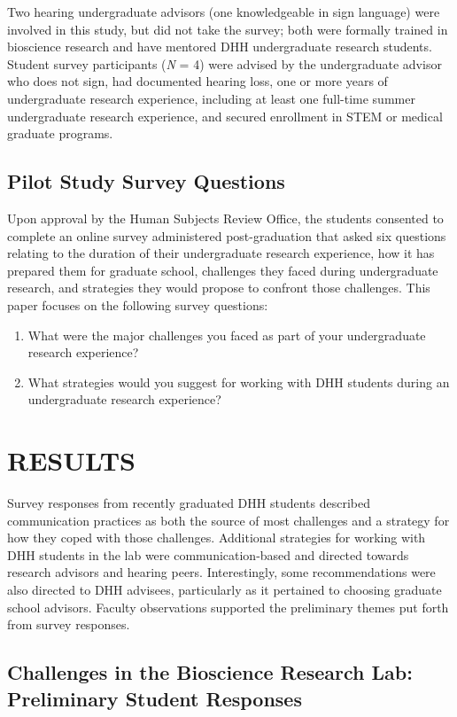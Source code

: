 \documentclass[11.5pt]{sig-alternate} %
\begin{document}
\begin{large}
Two hearing undergraduate advisors (one knowledgeable in sign language) were involved in this study, but did not take the survey; both were formally trained in bioscience research and have mentored DHH undergraduate research students. Student survey participants (\textit{N} = 4) were advised by the undergraduate advisor who does not sign, had documented hearing loss, one or more years of undergraduate research experience, including at least one full-time summer undergraduate research experience, and secured enrollment in STEM or medical graduate programs. 

\subsection*{Pilot Study Survey Questions}

Upon approval by the Human Subjects Review Office, the students consented to complete an online survey administered post-graduation that asked six questions relating to the duration of their undergraduate research experience, how it has prepared them for graduate school, challenges they faced during undergraduate research, and strategies they would propose to confront those challenges. This paper focuses on the following survey questions: 
\begin{enumerate}
    \item What were the major challenges you faced as part of your undergraduate research experience?
    \item What strategies would you suggest for working with DHH students during an undergraduate research experience?
\end{enumerate}

\section*{RESULTS}

Survey responses from recently graduated DHH students described communication practices as both the source of most challenges and a strategy for how they coped with those challenges. Additional strategies for working with DHH students in the lab were communication-based and directed towards research advisors and hearing peers. Interestingly, some recommendations were also directed to DHH advisees, particularly as it pertained to choosing graduate school advisors. Faculty observations supported the preliminary themes put forth from survey responses.

\subsection*{Challenges in the Bioscience Research Lab: Preliminary Student Responses}


\end{large}
\end{document}
